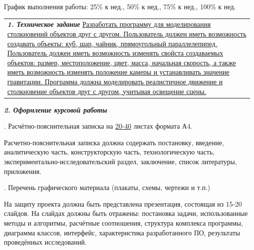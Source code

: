 
\noindent График выполнения работы: 25\% к  нед., 50\% к  нед., 75\% к  нед., 100\% к  нед.


\noindent \begin{tabularx}{\linewidth}{@{}X@{}}
    \textbf{\textit{1. Техническое задание}} \uline{
Разработать программу для моделирования столкновений объектов друг с другом. Пользователь должен иметь возможность создавать объекты: куб, шар, чайник, прямоугольный параллелепипед. Пользователь должен иметь возможность изменять свойста создаваемых объектов: размер, местоположение, цвет, масса, начальная скорость, а также иметь возможность изменять положение камеры и устанавливать значение гравитации. Программа должна моделировать реалистичное движение и столкновение объектов друг с другом, учитывая освещение сцены.
        \hfill}
\end{tabularx}


\noindent \textbf{\textit{2. Оформление курсовой работы}}

. Расчётно-пояснительная записка на \uline{20-40} листах формата А4.



\noindent Расчетно-пояснительная записка должна содержать постановку, введение, аналитическую часть, конструкторскую часть, технологическую часть, экспериментально-исследовательский раздел, заключение, список литературы, приложения.%

. Перечень графического материала (плакаты, схемы, чертежи и т.п.)

\noindent На защиту проекта должна быть представлена презентация, состоящая из 15-20 слайдов. На слайдах должны быть отражены: постановка задачи, использованные методы и алгоритмы, расчётные соотношения, структура комплекса программы, диаграмма классов, интерфейс, характеристика разработанного ПО, результаты проведённых исследований.%


